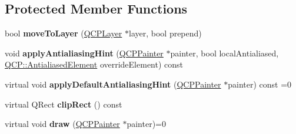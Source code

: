 \subsection*{Protected Member Functions}
\begin{DoxyCompactItemize}
\item 
\hypertarget{classQCPLayerable_af94484cfb7cbbddb7de522e9be71d9a4}{bool {\bfseries move\-To\-Layer} (\hyperlink{classQCPLayer}{Q\-C\-P\-Layer} $\ast$layer, bool prepend)}\label{classQCPLayerable_af94484cfb7cbbddb7de522e9be71d9a4}

\item 
\hypertarget{classQCPLayerable_a62bd552d1a45aa9accb24b310542279e}{void {\bfseries apply\-Antialiasing\-Hint} (\hyperlink{classQCPPainter}{Q\-C\-P\-Painter} $\ast$painter, bool local\-Antialiased, \hyperlink{namespaceQCP_ae55dbe315d41fe80f29ba88100843a0c}{Q\-C\-P\-::\-Antialiased\-Element} override\-Element) const }\label{classQCPLayerable_a62bd552d1a45aa9accb24b310542279e}

\item 
\hypertarget{classQCPLayerable_afdf83ddc6a265cbf4c89fe99d3d93473}{virtual void {\bfseries apply\-Default\-Antialiasing\-Hint} (\hyperlink{classQCPPainter}{Q\-C\-P\-Painter} $\ast$painter) const =0}\label{classQCPLayerable_afdf83ddc6a265cbf4c89fe99d3d93473}

\item 
\hypertarget{classQCPLayerable_a07a8f746640c3704b09910df297afcba}{virtual Q\-Rect {\bfseries clip\-Rect} () const }\label{classQCPLayerable_a07a8f746640c3704b09910df297afcba}

\item 
\hypertarget{classQCPLayerable_aecf2f7087482d4b6a78cb2770e5ed12d}{virtual void {\bfseries draw} (\hyperlink{classQCPPainter}{Q\-C\-P\-Painter} $\ast$painter)=0}\label{classQCPLayerable_aecf2f7087482d4b6a78cb2770e5ed12d}

\end{DoxyCompactItemize}
